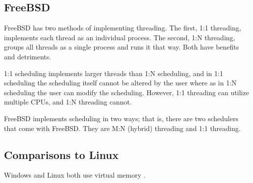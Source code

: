 \documentclass[10pt,draftclsnofoot,onecolumn,compsoc]{IEEEtran}
\begin{document}
	
	\subsection{FreeBSD}

	FreeBSD has two methods of implementing threading. The first, 1:1 threading, implements each thread as an individual process. The second, 1:N threading, groups all threads as a single process and runs it that way. Both have benefits and detriments. \cite{bsdsched}
	
	1:1 scheduling implements larger threads than 1:N scheduling, and in 1:1 scheduling the scheduling itself cannot be altered by the user where as in 1:N scheduling the user can modify the scheduling. However, 1:1 threading can utilize multiple CPUs, and 1:N threading cannot. \cite{bsdsched}
	
	FreeBSD implements scheduling in two ways; that is, there are two schedulers that come with FreeBSD. They are M:N (hybrid) threading and 1:1 threading. \cite{bsdsched} 
	

	\subsection{Comparisons to Linux}
	
	Windows and Linux both use virtual memory \cite{kernel} \cite{msdnvirt}. 

	

\end{document}

